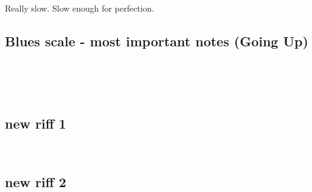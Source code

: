 \4\3\2


\newpage
Really slow. Slow enough for perfection. 

\subsection{Blues scale - most important notes (Going Up)}\\
\2\3\e\4\\\

\subsection{new riff 1}
\e\4 \4 \\ \4\e\3\2

\subsection{new riff 2}
\e\4 \5 \\ \4\e\3\2